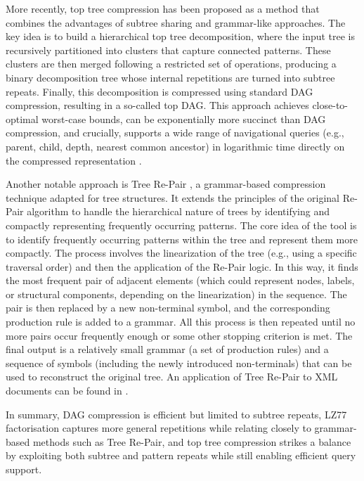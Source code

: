 More recently, top tree compression has been proposed as a method that combines the advantages of subtree sharing and grammar-like approaches. The key idea is to build a hierarchical top tree decomposition, where the input tree is recursively partitioned into clusters that capture connected patterns. These clusters are then merged following a restricted set of operations, producing a binary decomposition tree whose internal repetitions are turned into subtree repeats. Finally, this decomposition is compressed using standard DAG compression, resulting in a so-called top DAG. This approach achieves close-to-optimal worst-case bounds, can be exponentially more succinct than DAG compression, and crucially, supports a wide range of navigational queries (e.g., parent, child, depth, nearest common ancestor) in logarithmic time directly on the compressed representation \cite{billeTreeCompressionTop2015}.

Another notable approach is Tree Re-Pair \cite{lohrey2011tree}, a grammar-based compression technique adapted for tree structures. It extends the principles of the original Re-Pair algorithm \cite{larsson2000off} to handle the hierarchical nature of trees by identifying and compactly representing frequently occurring patterns.
The core idea of the tool is to identify frequently occurring patterns within the tree and represent them more compactly.
The process involves the linearization of the tree (e.g., using a specific traversal order) and then the application of the Re-Pair logic. In this way, it finds the most frequent pair of adjacent elements (which could represent nodes, labels, or structural components, depending on the linearization) in the sequence. The pair is then replaced by a new non-terminal symbol, and the corresponding production rule is added to a grammar. All this process is then repeated until no more pairs occur frequently enough or some other stopping criterion is met. The final output is a relatively small grammar (a set of production rules) and a sequence of symbols (including the newly introduced non-terminals) that can be used to reconstruct the original tree. An application of Tree Re-Pair to XML documents can be found in \cite{lohrey2013xml}.

In summary, DAG compression is efficient but limited to subtree repeats, LZ77 factorisation captures more general repetitions while relating closely to grammar-based methods such as Tree Re-Pair, and top tree compression strikes a balance by exploiting both subtree and pattern repeats while still enabling efficient query support.

